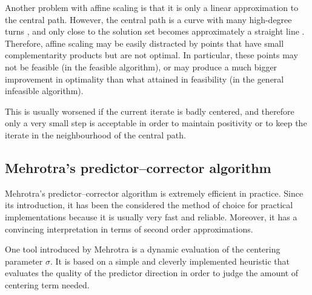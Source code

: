 Another problem with affine scaling is that it is only a linear 
approximation to the central path. However, the central path is a curve
with many high-degree turns \cite{VavasisYe}, and only close to the 
solution set becomes approximately a straight line \cite{Megiddo}. 
Therefore, affine scaling may be easily distracted by points that 
have small complementarity products but are not optimal. In particular, 
these points may not be feasible (in the feasible algorithm), or 
may produce a much bigger improvement in optimality than what 
attained in feasibility (in the general infeasible algorithm).

This is usually worsened if the current iterate is badly centered, 
and therefore only a very small step is acceptable in order to 
maintain positivity or to keep the iterate in the neighbourhood 
of the central path.

%
%
\subsection{Mehrotra's predictor--corrector algorithm}
\label{sec:MehrotraPC}

Mehrotra's predictor--corrector algorithm \cite{Mehrotra92,LustigMarstenShanno}
is extremely efficient in practice. Since its introduction, it has 
been the considered the method of choice for practical implementations 
because it is usually very fast and reliable. Moreover, it has a 
convincing interpretation in terms of second order approximations.



One tool introduced by Mehrotra \cite{Mehrotra92} is a dynamic evaluation 
of the centering parameter $\sigma$. It is based on a simple and cleverly 
implemented heuristic that evaluates the quality of the predictor direction
in order to judge the amount of centering term needed.

